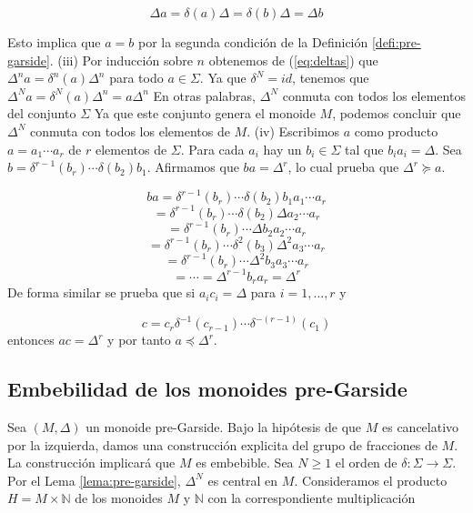 \documentclass[12pt]{article}
\theoremstyle{definition}
\begin{document}
$$\Delta a= \delta(a)\Delta = \delta(b)\Delta = \Delta b$$

Esto implica que $a=b$ por la segunda condición de la Definición \ref{defi:pre-garside}.
\newline
\newline
(iii) Por inducción sobre $n$ obtenemos de (\ref{eq:deltas}) que $\Delta^na=\delta^n(a)\Delta^n$ para todo $a\in\Sigma$. Ya que $\delta^N=id$, tenemos que $\Delta^N a=\delta^N(a)\Delta^n=a\Delta^n$ En otras palabras, $\Delta^N$ conmuta con todos los elementos del conjunto $\Sigma$ Ya que este conjunto genera el monoide $M$, podemos concluir que $\Delta^N$ conmuta con todos los elementos de $M$.
\newline
\newline
(iv) Escribimos $a$ como producto $a=a_1\cdots a_r$ de $r$ elementos de $\Sigma$. Para cada $a_i$ hay un $b_i\in\Sigma$ tal que $b_ia_i=\Delta$. Sea $b=\delta^{r-1}(b_r)\cdots\delta(b_2)b_1$. Afirmamos que $ba=\Delta^r$, lo cual prueba que $\Delta^r\succeq a$.

$$ba=\delta^{r-1}(b_r)\cdots\delta(b_2)b_1a_1\cdots a_r$$
$$=\delta^{r-1}(b_r)\cdots\delta(b_2)\Delta a_2\cdots a_r$$
$$=\delta^{r-1}(b_r)\cdots\Delta b_2a_2\cdots a_r$$
$$=\delta^{r-1}(b_r)\cdots\delta^2(b_3)\Delta^2 a_3\cdots a_r$$
$$=\delta^{r-1}(b_r)\cdots\Delta^2 b_3a_3\cdots a_r$$
$$=\cdots= \Delta^{r-1}b_ra_r=\Delta^r$$
\newline
De forma similar se prueba que si $a_ic_i=\Delta$ para $i=1,\ldots,r$ y

$$c=c_r\delta^{-1}(c_{r-1})\cdots\delta^{-(r-1)}(c_1)$$
\newline
entonces $ac=\Delta^r$ y por tanto $a\preceq\Delta^r$.

\subsection{Embebilidad de los monoides pre-Garside}

Sea $(M,\Delta)$ un monoide pre-Garside. Bajo la hipótesis de que $M$ es cancelativo por la izquierda, damos una construcción explicita del grupo de fracciones de $M$. La construcción implicará que $M$ es embebible.
\newline
\newline
Sea $N\geq 1$ el orden de $\delta:\Sigma\rightarrow\Sigma$. Por el Lema \ref{lema:pre-garside}, $\Delta^N$ es central en $M$. Consideramos el producto $H=M\times\mathbb{N}$ de los monoides $M$ y $\mathbb{N}$ con la correspondiente multiplicación
\end{document}
